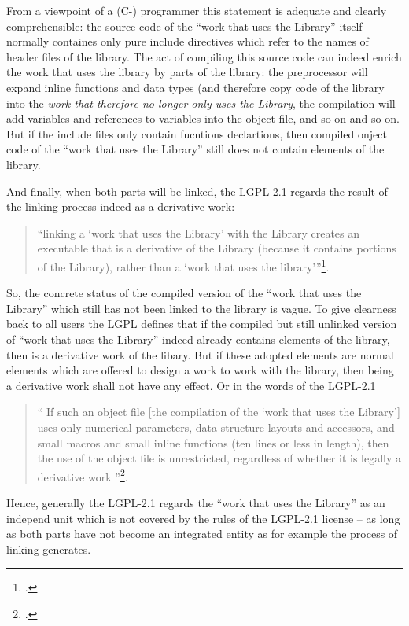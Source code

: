 From a viewpoint of a (C-) programmer this statement is adequate and clearly
comprehensible: the source code of the \enquote{work that uses the Library}
itself normally containes only pure include directives which refer to the names
of header files of the library. The act of compiling this source code can indeed 
enrich the work that uses the library by parts of the library: the preprocessor
will expand inline functions and data types (and therefore copy code of the
library into the \emph{work that therefore no longer only uses the Library}, the
compilation will add variables and references to variables into the object file,
and so on and so on. But if the include files only contain
fucntions declartions, then compiled onject code of the \enquote{work that uses
the Library} still does not contain elements of the library.

And finally, when both parts will be linked, the LGPL-2.1 regards the
result of the linking process indeed as a derivative work:
\begin{quote}\enquote{linking a \enquote{work that uses the Library} with the
Library creates an executable that is a derivative of the Library (because it
contains portions of the Library), rather than a \enquote{work that uses the
library}}\footcite[cf.][\nopage wp §5]{Lgpl21OsiLicense1999a}.
\end{quote}

So, the concrete status of the compiled version of the \enquote{work that uses
the Library} which still has not been linked to the library is vague. To give
clearness back to all users the LGPL defines that if the compiled but still
unlinked version of \enquote{work that uses the Library} indeed already contains
elements of the library, then is a derivative work of the libary. But if these
adopted elements are normal elements which are offered to design a work to work
with the library, then being a derivative work shall not have any effect. Or in
the words of the LGPL-2.1

\begin{quote}\enquote{ If such an object file [the compilation of the
\enquote{work that uses the Library}] uses only numerical parameters, data structure
layouts and accessors, and small macros and small inline functions (ten lines or
less in length), then the use of the object file is unrestricted, regardless of
whether it is legally a derivative work }\footcite[cf.][\nopage wp
§5]{Lgpl21OsiLicense1999a}.
\end{quote}

Hence, generally the LGPL-2.1 regards the \enquote{work that uses the Library}
as an independ unit which is not covered by the rules of the LGPL-2.1 license --
as long as both parts have not become an integrated entity as for example the
process of linking generates.

